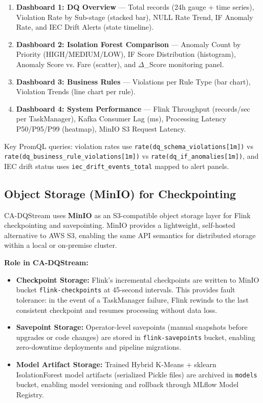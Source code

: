 \begin{enumerate}
    \item \textbf{Dashboard 1: DQ Overview} --- Total records (24h gauge + time series), Violation Rate by Sub-stage (stacked bar), NULL Rate Trend, IF Anomaly Rate, and IEC Drift Alerts (state timeline).

    \item \textbf{Dashboard 2: Isolation Forest Comparison} --- Anomaly Count by Priority (HIGH/MEDIUM/LOW), IF Score Distribution (histogram), Anomaly Score vs. Fare (scatter), and $\Delta$\_Score monitoring panel.

    \item \textbf{Dashboard 3: Business Rules} --- Violations per Rule Type (bar chart), Violation Trends (line chart per rule).

    \item \textbf{Dashboard 4: System Performance} --- Flink Throughput (records/sec per TaskManager), Kafka Consumer Lag (ms), Processing Latency P50/P95/P99 (heatmap), MinIO S3 Request Latency.
\end{enumerate}

Key PromQL queries: violation rates use \texttt{rate(dq\_schema\_violations[1m])} vs \texttt{rate(dq\_business\_rule\_violations[1m])} vs \texttt{rate(dq\_if\_anomalies[1m])}, and IEC drift status uses \texttt{iec\_drift\_events\_total} mapped to alert panels.

\subsection{Object Storage (MinIO) for Checkpointing}

CA-DQStream uses \textbf{MinIO} as an S3-compatible object storage layer for Flink checkpointing and savepointing. MinIO provides a lightweight, self-hosted alternative to AWS S3, enabling the same API semantics for distributed storage within a local or on-premise cluster.

\textbf{Role in CA-DQStream:}
\begin{itemize}
    \item \textbf{Checkpoint Storage:} Flink's incremental checkpoints are written to MinIO bucket \texttt{flink-checkpoints} at 45-second intervals. This provides fault tolerance: in the event of a TaskManager failure, Flink rewinds to the last consistent checkpoint and resumes processing without data loss.
    \item \textbf{Savepoint Storage:} Operator-level savepoints (manual snapshots before upgrades or code changes) are stored in \texttt{flink-savepoints} bucket, enabling zero-downtime deployments and pipeline migrations.
    \item \textbf{Model Artifact Storage:} Trained Hybrid K-Means + sklearn IsolationForest model artifacts (serialized Pickle files) are archived in \texttt{models} bucket, enabling model versioning and rollback through MLflow Model Registry.
\end{itemize}

